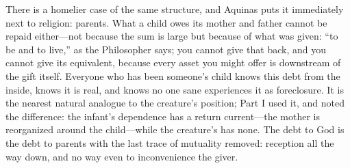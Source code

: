 There is a homelier case of the same structure, and Aquinas puts it immediately next to religion: parents. What a child owes its mother and father cannot be repaid either---not because the sum is large but because of what was given: ``to be and to live,'' as the Philosopher says; you cannot give that back, and you cannot give its equivalent, because every asset you might offer is downstream of the gift itself. Everyone who has been someone's child knows this debt from the inside, knows it is real, and knows no one sane experiences it as foreclosure. It is the nearest natural analogue to the creature's position; Part I used it, and noted the difference: the infant's dependence has a return current---the mother is reorganized around the child---while the creature's has none. The debt to God is the debt to parents with the last trace of mutuality removed: reception all the way down, and no way even to inconvenience the giver.

